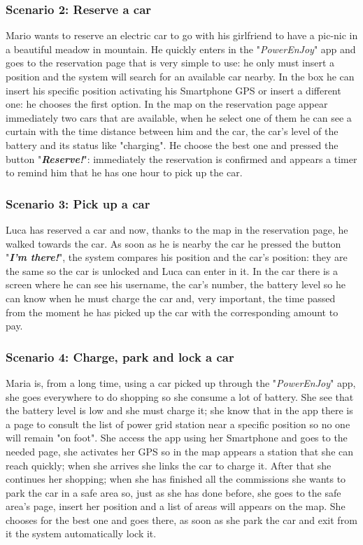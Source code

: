 \subsubsection{Scenario 2: Reserve a car} \label{sce2}
Mario wants to reserve an electric car to go with his girlfriend to have a pic-nic in a beautiful meadow in mountain. He quickly enters in the "\textit{PowerEnJoy}" app and goes to the reservation page that is very simple to use: he only must insert a position and the system will search for an available car nearby. In the box he can insert his specific position activating his Smartphone GPS or insert a different one: he chooses the first option. In the map on the reservation page appear immediately two cars that are available, when he select one of them he can see a curtain with the time distance between him and the car, the car's level of the battery and its status like "charging". He choose the best one and pressed the button "\textbf{\textit{Reserve!}}": immediately the reservation is confirmed and appears a timer to remind him that he has one hour to pick up the car.
\subsubsection{Scenario 3: Pick up a car} \label{sce3}
Luca has reserved a car and now, thanks to the map in the reservation page, he walked towards the car. As soon as he is nearby the car he pressed the button "\textbf{\textit{I'm there!}}", the system compares his position and the car's position: they are the same so the car is unlocked and Luca can enter in it. In the car there is a screen where he can see his username, the car's number, the battery level so he can know when he must charge the car and, very important, the time passed from the moment he has picked up the car with the corresponding amount to pay.
\subsubsection{Scenario 4: Charge, park and lock a car} \label{sce4}
Maria is, from a long time, using a car picked up through the "\textit{PowerEnJoy}" app, she goes everywhere to do shopping so she consume a lot of battery. She see that the battery level is low and she must charge it; she know that in the app there is a page to consult the list of power grid station near a specific position so no one will remain "on foot". She access the app using her Smartphone and goes to the needed page, she activates her GPS so in the map appears a station that she can reach quickly; when she arrives she links the car to charge it. After that she continues her shopping; when she has finished all the commissions she wants to park the car in a safe area so, just as she has done before, she goes to the safe area's page, insert her position and a list of areas will appears on the map. She chooses for the best one and goes there, as soon as she park the car and exit from it the system automatically lock it.  
